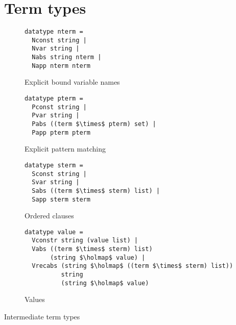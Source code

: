 
\section{Term types}
\label{sec:terms:types}


\begin{code}
  \begin{subfigure}[t]{.4\linewidth}
    \begin{lstlisting}[language=Isabelle]
datatype nterm =
  Nconst string |
  Nvar string |
  Nabs string nterm |
  Napp nterm nterm\end{lstlisting}
    \caption{Explicit bound variable names}
    \label{code:terms:intermediate:named}
  \end{subfigure}\hfill
  \begin{subfigure}[t]{.55\linewidth}
    \begin{lstlisting}[language=Isabelle]
datatype pterm =
  Pconst string |
  Pvar string |
  Pabs ((term $\times$ pterm) set) |
  Papp pterm pterm\end{lstlisting}
    \caption{Explicit pattern matching}
    \label{code:terms:intermediate:pabs}
  \end{subfigure}

  \begin{subfigure}[t]{.4\linewidth}
    \begin{lstlisting}[language=Isabelle]
datatype sterm =
  Sconst string |
  Svar string |
  Sabs ((term $\times$ sterm) list) |
  Sapp sterm sterm\end{lstlisting}
    \caption{Ordered clauses}
    \label{code:terms:intermediate:seq}
  \end{subfigure}\hfill
  \begin{subfigure}[t]{.55\linewidth}
    \begin{lstlisting}[language=Isabelle]
datatype value =
  Vconstr string (value list) |
  Vabs ((term $\times$ sterm) list)
       (string $\holmap$ value) |
  Vrecabs (string $\holmap$ ((term $\times$ sterm) list))
          string
          (string $\holmap$ value)\end{lstlisting}
    \caption{Values}
    \label{code:terms:intermediate:value}
  \end{subfigure}
  \caption{Intermediate term types}
  \label{code:terms:intermediate}
\end{code}

